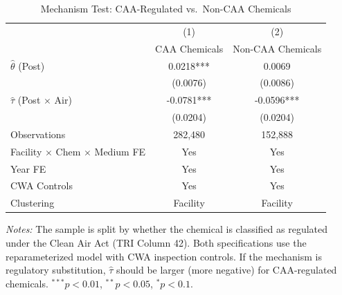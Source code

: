 \begin{table}[htbp]
\centering
\caption{Mechanism Test: CAA-Regulated vs.\ Non-CAA Chemicals}
\label{tab:mechanism}
\begin{tabular}{lcc}
\toprule
& (1) & (2) \\
& CAA Chemicals & Non-CAA Chemicals \\
\midrule
$\hat{\theta}$ (Post) & 0.0218*** & 0.0069 \\
& (0.0076) & (0.0086) \\[6pt]
$\hat{\tau}$ (Post $\times$ Air) & -0.0781*** & -0.0596*** \\
& (0.0204) & (0.0204) \\[6pt]
\midrule
Observations & 282,480 & 152,888 \\
Facility $\times$ Chem $\times$ Medium FE & Yes & Yes \\
Year FE & Yes & Yes \\
CWA Controls & Yes & Yes \\
Clustering & Facility & Facility \\
\bottomrule
\end{tabular}
\begin{minipage}{0.95\textwidth}
\vspace{0.3em}
\footnotesize \textit{Notes:} The sample is split by whether the chemical is classified as regulated under the Clean Air Act (TRI Column 42). Both specifications use the reparameterized model with CWA inspection controls. If the mechanism is regulatory substitution, $\hat{\tau}$ should be larger (more negative) for CAA-regulated chemicals. $^{***}p<0.01$, $^{**}p<0.05$, $^{*}p<0.1$.
\end{minipage}
\end{table}
